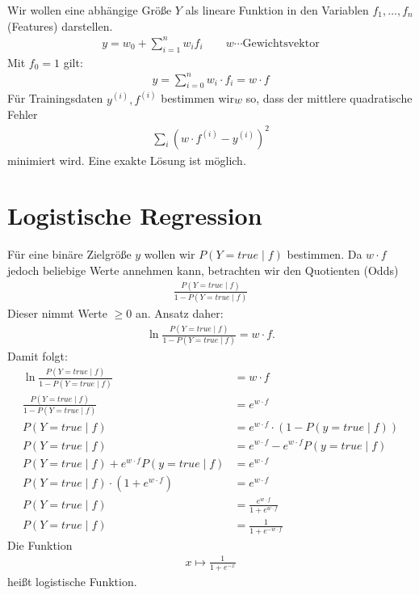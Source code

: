 Wir wollen eine abhängige Größe $Y$ als lineare Funktion in den Variablen
$f_1,\ldots, f_n$ (Features) darstellen.
\begin{align*}
    y=w_0+\sum\limits_{i=1}^n w_i f_i \qquad w\cdots \text{Gewichtsvektor}
\end{align*}
Mit $f_0=1$ gilt:
\begin{align*}
    y=\sum\limits_{i=0}^n w_i\cdot f_i= w \cdot f
\end{align*}
Für Trainingsdaten $y^{(i)}, f^{(i)}$ bestimmen wir$w$ so, dass der mittlere
quadratische Fehler
\begin{align*}
    \sum\limits_i {(w\cdot f^{(i)}-y^{(i)})}^2
\end{align*}
minimiert wird. Eine exakte Lösung ist möglich.

\section{Logistische Regression}
\label{sub:logistische_regression}

Für eine binäre Zielgröße $y$ wollen wir $P(Y=true\mid f)$ bestimmen. Da $w\cdot f$
jedoch beliebige Werte annehmen kann, betrachten wir den Quotienten (Odds)
\begin{align*}
    \frac{P(Y=true\mid f)}{1-P(Y=true\mid f)}
\end{align*}
Dieser nimmt Werte $\geq 0$ an. Ansatz daher:
\begin{align}
    \ln \frac{P(Y=true\mid f)}{1-P(Y=true\mid f)} = w\cdot f. \tag{1}\label{eq:one}
\end{align}
Damit folgt:
\begin{align*}
    \ln \frac{P(Y=true\mid f)}{1-P(Y=true\mid f)} &= w\cdot f\\
    \frac{P(Y=true\mid f)}{1-P(Y=true\mid f)} &= e^{w\cdot f}\\
    P(Y=true\mid f) &=e^{w\cdot f}\cdot (1-P(y=true\mid f))\\
    P(Y=true\mid f) &=e^{w\cdot f} - e^{w\cdot f}P(y=true\mid f)\\
    P(Y=true\mid f) + e^{w\cdot f}P(y=true\mid f)&=e^{w\cdot f} \\
    P(Y=true\mid f)\cdot (1+ e^{w\cdot f}) &=e^{w\cdot f} \\
    P(Y=true\mid f) &=\frac{e^{w\cdot f}}{1+ e^{w\cdot f}} \\
    P(Y=true\mid f) &=\frac{1}{1+ e^{-w\cdot f}} \tag{2}\label{eq:two}
\end{align*}
Die Funktion
\begin{align*}
x\mapsto \frac{1}{1+e^{-x}}
\end{align*}
heißt logistische Funktion.

